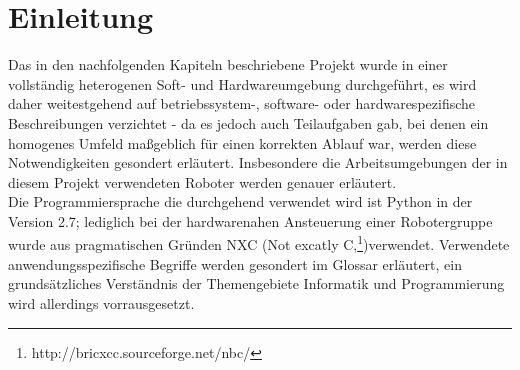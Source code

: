 \chapter{Einleitung}

Das in den nachfolgenden Kapiteln beschriebene Projekt wurde in einer vollständig heterogenen Soft- und Hardwareumgebung durchgeführt, es wird daher weitestgehend auf betriebssystem-, software- oder hardwarespezifische Beschreibungen verzichtet - da es jedoch auch Teilaufgaben gab, bei denen ein homogenes Umfeld maßgeblich für einen korrekten Ablauf war, werden diese Notwendigkeiten gesondert erläutert. Insbesondere die Arbeitsumgebungen der in diesem Projekt verwendeten Roboter werden genauer erläutert.\\
Die Programmiersprache die durchgehend verwendet wird ist Python in der Version 2.7; lediglich bei der hardwarenahen Ansteuerung einer Robotergruppe wurde aus pragmatischen Gründen NXC (Not excatly C,\footnote{http://bricxcc.sourceforge.net/nbc/})verwendet.
Verwendete anwendungsspezifische Begriffe werden gesondert im Glossar erläutert, ein grundsätzliches Verständnis der Themengebiete Informatik und Programmierung wird allerdings vorrausgesetzt.

